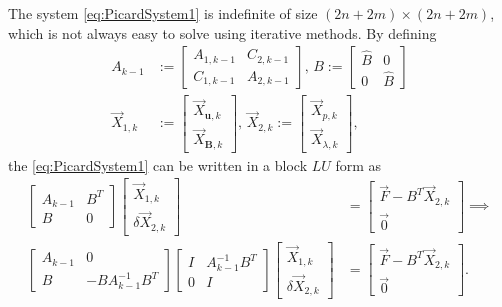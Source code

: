 \documentclass[3p]{elsarticle}
\def\V#1{\mathbf{#1}}
\begin{document}
The system \eqref{eq:PicardSystem1} is indefinite of size $(2n+2m) \times (2n+2m)$, which is not always easy to solve using iterative methods. By defining 
\begin{equation}
    \label{eq:PicardSystem2}
    \begin{aligned}
      A_{k-1} &:= \begin{bmatrix} 
        A_{1,k-1} & C_{2,k-1} \\ 
        C_{1,k-1} &  A_{2,k-1} 
        \end{bmatrix}, \, B:= \begin{bmatrix} 
        \widehat{B} & 0 \\ 
        0   &  \widehat{B}
        \end{bmatrix} \\
        \overrightarrow{X}_{1,k} &:= \begin{bmatrix}
            \overrightarrow{X}_{\V{u},k} \\
            \overrightarrow{X}_{\V{B},k}
        \end{bmatrix}, \, 
        \overrightarrow{X}_{2,k} := \begin{bmatrix}
            \overrightarrow{X}_{p,k} \\
            \overrightarrow{X}_{\lambda,k}
        \end{bmatrix},
    \end{aligned}
\end{equation}
the \eqref{eq:PicardSystem1} can be written in a block $LU$ form as
\begin{equation}\label{eq:PicardSystem3}
\begin{aligned}  
\begin{bmatrix} 
A_{k-1} & B^T \\ 
B &  0 
\end{bmatrix}
\begin{bmatrix} \overrightarrow{X}_{1,k}  \\ 
\delta \overrightarrow{X}_{2,k}
\end{bmatrix}
& = \begin{bmatrix} \overrightarrow{F} - B^T \overrightarrow{X}_{2,k} \\ \overrightarrow{0} \end{bmatrix} \implies \\
\begin{bmatrix} 
A_{k-1} & 0 \\ 
B &  -B A_{k-1}^{-1} B^T 
\end{bmatrix}
\begin{bmatrix} 
I & A_{k-1}^{-1} B^T \\
0 & I 
\end{bmatrix} 
\begin{bmatrix} 
\overrightarrow{X}_{1,k}  \\ 
\delta \overrightarrow{X}_{2,k}
\end{bmatrix}
& = 
\begin{bmatrix} \overrightarrow{F} - B^T \overrightarrow{X}_{2,k} \\ \overrightarrow{0} 
\end{bmatrix}.
\end{aligned}
\end{equation}
\end{document}
